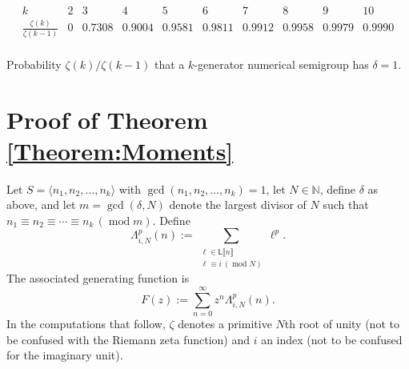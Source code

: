 \documentclass[10pt,reqno]{amsart}
\newcommand{\NN}{\mathbb{N}}
\newcommand{\Le}{\mathsf{L}}
\providecommand{\multi}[1]{\llbracket #1 \rrbracket}
\newcommand{\0}{\color{lightgray}0}
\renewcommand{\pmod}[1]{\,(\operatorname{mod} #1)}
\renewcommand\>{\rangle}
\newcommand\<{\langle}
\theoremstyle{plain}
\theoremstyle{definition}
\begin{document}
\begin{table}
\begin{equation*}
\begin{array}{c|ccccccccc}
k &  2 & 3 & 4 & 5 & 6 & 7 & 8 & 9 & 10 \\
 \hline
\frac{ \zeta(k)}{\zeta(k-1)} &  0 & 0.7308 & 0.9004 & 0.9581 & 0.9811 & 0.9912 & 0.9958 & 0.9979 & 0.9990 \\
\end{array}
\end{equation*}
\caption{Probability $\zeta(k) / \zeta(k-1)$ that a $k$-generator numerical semigroup has $\delta = 1$.}
\label{Table:Zeta}
\end{table}


\section{Proof of Theorem \ref{Theorem:Moments}}\label{Section:Proof}
Let $S = \<n_1,n_2,\ldots,n_k\>$ with $\gcd(n_1,n_2,\ldots,n_k)=1$, let $N \in \NN$, define $\delta$ as above, and let
$m = \gcd(\delta, N)$ denote the largest divisor of $N$ such that 
$n_1 \equiv n_2 \equiv \cdots \equiv n_k \pmod{ m}$.  Define
\begin{equation}\label{eq:P}
\Lambda^p_{i,N}(n) := \sum_{\substack{\ell \in \Le\multi{n} \\ \ell \equiv i \pmod{N}}} \!\!\!\!\!\!\!\! \ell^p.
\end{equation}
The associated generating function is
\begin{equation}\label{eq:F1}
F(z):= \sum_{n=0}^{\infty} z^n \Lambda^p_{i,N}(n).
\end{equation}
In the computations that follow, $\zeta$ denotes a primitive $N$th root of unity (not to be confused with the Riemann zeta function) and $i$
an index (not to be confused for the imaginary unit).

\end{document}
